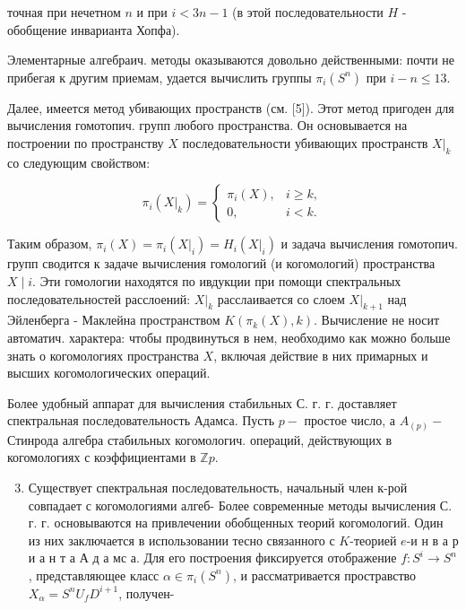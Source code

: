 \documentclass[10pt]{article}
\begin{document}
точная при нечетном $n$ и при $i<3 n-1$ (в этой последовательности $H$ - обобщение инварианта Хопфа).



Элементарные алгебраич. методы оказываются довольно действенными: почти не прибегая к другим приемам, удается вычислить группы $\pi_{i}\left(S^{n}\right)$ при $i-n \leqslant 13$.



Далее, имеется метод убивающих пространств (см. [5]). Этот метод пригоден для вычисления гомотопич. групп любого пространства. Он основывается на построении по пространству $X$ последовательности убивающих пространств $\left.X\right|_{k}$ со следующим свойством:



\[

\pi_{i}\left(\left.X\right|_{k}\right)=\left\{\begin{array}{cc}

\pi_{i}(X), & i \geqslant k, \\

0, & i<k .

\end{array}\right.

\]



Таким образом, $\pi_{i}(X)=\pi_{i}\left(\left.X\right|_{i}\right)=H_{i}\left(\left.X\right|_{i}\right)$ и задача вычисления гомотопич. групп сводится к задаче вычисления гомологий (и когомологий) пространства $X \mid i$. Эти гомологии находятся по ивдукции при помощи спектральных последовательностей расслоений: $\left.X\right|_{k}$ расслаивается со слоем $\left.X\right|_{k+1}$ над Эйленберга - Маклейна пространством $K\left(\pi_{k}(X), k\right)$. Вычисление не носит автоматич. характера: чтобы продвинуться в нем, необходимо как можно больше знать о когомологиях пространства $X$, включая действие в них примарных и высших когомологических операций.



Более удобный аппарат для вычисления стабильных С. г. г. доставляет спектральная последовательность Адамса. Пусть $p-$ простое число, а $A_{(p)}-$ Стинрода алгебра стабильных когомологич. операций, действующих в когомологиях с коэффициентами в $\mathbb{Z} p$.



\begin{enumerate}

  \setcounter{enumi}{2}

  \item Существует спектральная последовательность, начальный член к-рой совпадает с когомологиями алгеб- Более современные методы вычисления С. г. г. основываются на привлечении обобщенных теорий когомологий. Один из них заключается в использовании тесно связанного с $K$-теорией $e$-и н в а р и а н т а А д а мс а. Для его построения фиксируется отображение $f: S^{i} \rightarrow S^{n}$, представляющее класс $\alpha \in \pi_{i}\left(S^{n}\right)$, и рассматривается простравство $X_{\alpha}=S^{n} U_{f} D^{i+1}$, получен-

\end{enumerate}
\end{document}

